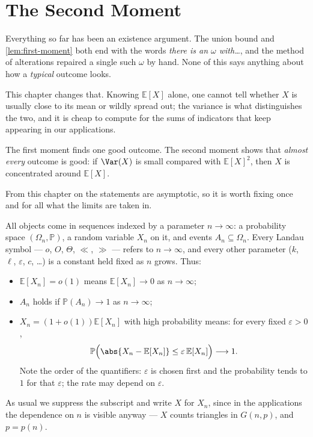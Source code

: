 \chapter{The Second Moment}


Everything so far has been an existence argument. The union bound and \autoref{lem:first-moment} both end with the words \emph{there is an \(\omega\) with\dots}, and the method of alterations repaired a single such \(\omega\) by hand. None of this says anything about how a \emph{typical} outcome looks.

This chapter changes that. Knowing \(\mathbb{E}[X]\) alone, one cannot tell whether \(X\) is usually close to its mean or wildly spread out; the variance is what distinguishes the two, and it is cheap to compute for the sums of indicators that keep appearing in our applications.

\begin{moral}
    The first moment finds one good outcome. The second moment shows that \emph{almost every} outcome is good: if \(\Var(X)\) is small compared with \(\mathbb{E}[X]^2\), then \(X\) is concentrated around \(\mathbb{E}[X]\).
\end{moral}

From this chapter on the statements are asymptotic, so it is worth fixing once and for all what the limits are taken in.

\begin{notation}[Asymptotics]
    All objects come in sequences indexed by a parameter \(n \to \infty\): a probability space \((\Omega_n, \mathbb{P})\), a random variable \(X_n\) on it, and events \(A_n \subseteq \Omega_n\). Every Landau symbol --- \(o\), \(O\), \(\Theta\), \(\ll\), \(\gg\) --- refers to \(n \to \infty\), and every other parameter (\(k\), \(\ell\), \(\varepsilon\), \(c\), \dots) is a constant held fixed as \(n\) grows. Thus:
    \begin{itemize}
        \item \(\mathbb{E}[X_n] = o(1)\) means \(\mathbb{E}[X_n] \to 0\) as \(n \to \infty\);
        \item \(A_n\) holds  if \(\mathbb{P}(A_n) \to 1\) as \(n \to \infty\);
        \item \(X_n = (1 + o(1)) \mathbb{E}[X_n]\) with high probability means: for every fixed \(\varepsilon > 0\),
        \[
            \mathbb{P}\Bigl( \abs{X_n - \mathbb{E}[X_n]} \le \varepsilon \, \mathbb{E}[X_n] \Bigr) \longrightarrow 1 .
        \]
        Note the order of the quantifiers: \(\varepsilon\) is chosen first and the probability tends to \(1\) for that \(\varepsilon\); the rate may depend on \(\varepsilon\).
    \end{itemize}
    As usual we suppress the subscript and write \(X\) for \(X_n\), since in the applications the dependence on \(n\) is visible anyway --- \(X\) counts triangles in \(G(n,p)\), and \(p = p(n)\).
\end{notation}

